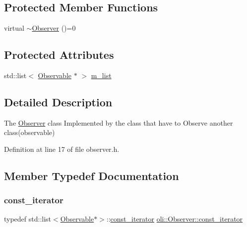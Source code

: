 \subsection*{Protected Member Functions}
\begin{DoxyCompactItemize}
\item 
virtual \hyperlink{classoli_1_1_observer_a204c75941c51c46cf8930361d8948939}{$\sim$\+Observer} ()=0
\end{DoxyCompactItemize}
\subsection*{Protected Attributes}
\begin{DoxyCompactItemize}
\item 
std\+::list$<$ \hyperlink{classoli_1_1_observable}{Observable} $\ast$ $>$ \hyperlink{classoli_1_1_observer_acf615598b1c72e779d12c8b9b9422c86}{m\+\_\+list}
\end{DoxyCompactItemize}


\subsection{Detailed Description}
The \hyperlink{classoli_1_1_observer}{Observer} class Implemented by the class that have to Observe another class(observable) 

Definition at line 17 of file observer.\+h.



\subsection{Member Typedef Documentation}
\hypertarget{classoli_1_1_observer_a1b49363f9c8afdb6734aa28d685579ef}{}\label{classoli_1_1_observer_a1b49363f9c8afdb6734aa28d685579ef} 
\subsubsection{\texorpdfstring{const\+\_\+iterator}{const\_iterator}}
{\footnotesize\ttfamily typedef std\+::list$<$\hyperlink{classoli_1_1_observable}{Observable}$\ast$$>$\+::\hyperlink{classoli_1_1_observer_a1b49363f9c8afdb6734aa28d685579ef}{const\+\_\+iterator} \hyperlink{classoli_1_1_observer_a1b49363f9c8afdb6734aa28d685579ef}{oli\+::\+Observer\+::const\+\_\+iterator}\hspace{0.3cm}{\ttfamily [protected]}}



